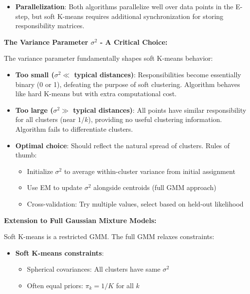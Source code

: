 \documentclass[12pt]{article}
\begin{document}
\begin{explanation}
\begin{itemize}
    \item \textbf{Parallelization}:
    Both algorithms parallelize well over data points in the E-step, but soft K-means requires additional synchronization for storing responsibility matrices.
\end{itemize}

\textbf{The Variance Parameter $\sigma^2$ - A Critical Choice:}

The variance parameter fundamentally shapes soft K-means behavior:

\begin{itemize}
    \item \textbf{Too small ($\sigma^2 \ll$ typical distances)}: Responsibilities become  essentially binary (0 or 1), defeating the purpose of soft clustering. Algorithm behaves like hard K-means but with extra computational cost.

    \item \textbf{Too large ($\sigma^2 \gg$ typical distances)}: All points have similar responsibility for all clusters (near $1/k$), providing no useful clustering information. Algorithm fails to differentiate clusters.

    \item \textbf{Optimal choice}: Should reflect the natural spread of clusters. Rules of thumb:
    \begin{itemize}
        \item Initialize $\sigma^2$ to average within-cluster variance from initial assignment
        \item Use EM to update $\sigma^2$ alongside centroids (full GMM approach)
        \item Cross-validation: Try multiple values, select based on held-out likelihood
    \end{itemize}
\end{itemize}

\textbf{Extension to Full Gaussian Mixture Models:}

Soft K-means is a restricted GMM. The full GMM relaxes constraints:

\begin{itemize}
    \item \textbf{Soft K-means constraints}:
    \begin{itemize}
        \item Spherical covariances: All clusters have same $\sigma^2$
        \item Often equal priors: $\pi_k = 1/K$ for all $k$
    \end{itemize}


\end{itemize}
\end{explanation}
\end{document}
